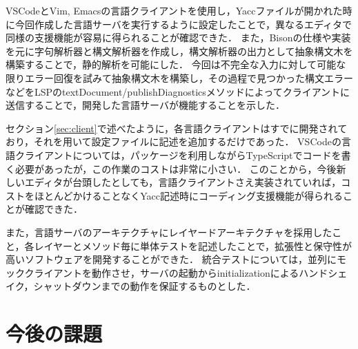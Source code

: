 \documentclass[fontsize=9bp,twocolumn,column_gap=2.36zw,a4paper,report]{jlreq}
\begin{document}
VSCodeとVim, Emacsの言語クライアントを使用し，Yaccファイルが開かれた時に今回作成した言語サーバを実行するように設定したことで，異なるエディタで同様の支援機能が容易に得られることが確認できた．
また，Bisonの仕様や実装を元に字句解析器と構文解析器を作成し，構文解析器の出力として抽象構文木を構築することで，静的解析を可能にした．
今回は不完全な入力に対して可能な限りエラー回復を試みて抽象構文木を構築し，その過程で見つかった構文エラーなどをLSPのtextDocument/publishDiagnosticsメソッドによってクライアントに送信することで，開発した言語サーバが機能することを示した．\par
セクション\ref{sec:client}で述べたように，各言語クライアントはすでに開発されており，それを用いて設定ファイルに記述を追加するだけであった．
VSCodeの言語クライアントについては，パッケージを利用しながらTypeScriptでコードを書く必要があったが，この作業のコストは非常に小さい．
このことから，今後新しいエディタが台頭したとしても，言語クライアントさえ実装されていれば，コストをほとんどかけることなくYacc記述時にコーディング支援機能が得られることが確認できた．\par
また，言語サーバのアーキテクチャにレイヤードアーキテクチャを採用したこと，各レイヤーとメソッド毎に単体テストを記述したことで，拡張性と保守性が高いソフトウェアを開発することができた．
統合テストについては，並列にモッククライアントを動作させ，サーバの起動からinitializationによるハンドシェイク，シャットダウンまでの動作を保証するものとした．
\newline

\chapter{今後の課題}
\end{document}
